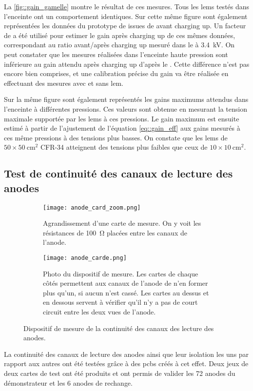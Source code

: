       La \autoref{fig::gain_gamelle} montre le résultat de ces mesures. Tous les \glspl{lem} testés dans l'enceinte ont un comportement identiques. Sur cette même figure sont également représentées les données du prototype de \threeL{} issues de \cite{Cantini2014} avant charging up. Un facteur de  a été utilisé pour estimer le gain après charging up de ces mêmes données, correspondant au ratio avant/après charging up mesuré dans le \threeL{} à \SI{3.4}{\kilo\volt}. On peut constater que les mesures réalisées dans l'enceinte haute pression sont inférieure au gain attendu après charging up d'après le \threeL{}. Cette différence n'est pas encore bien comprises, et une calibration précise du gain va être réalisée en effectuant des mesures avec et sans \gls{lem}. 

      Sur la même figure sont également représentés les gains maximums attendus dans l'enceinte à différentes pressions. Ces valeurs sont obtenue en mesurant la tension maximale supportée par les \glspl{lem} à ces pressions. Le gain maximum est ensuite estimé à partir de l'ajustement de l'équation \eqref{eq::gain_eff} aux gains mesurés à ces même pressions à des tensions plus basses. On constate que les \glspl{lem} de $50\times\SI{50}{\centi\meter\squared}$  CFR-34 atteignent des tensions plus faibles que ceux de $10\times\SI{10}{\centi\meter\squared}$.
        
    \subsection{Test de continuité des canaux de lecture des anodes}\label{sec::test_anode}

      \begin{figure}
        \begin{subfigure}[t]{0.48\textwidth}
          \texttt{[image: anode\_card\_zoom.png]}
          \caption{\label{fig::anode_card_zoom}Agrandissement d'une carte de mesure. On y voit les résistances de \SI{100}{\ohm} placées entre les canaux de l'anode.}
        \end{subfigure}
        \hfill
        \begin{subfigure}[t]{0.48\textwidth}
          \texttt{[image: anode\_carde.png]}
          \caption{\label{fig::anode_card}Photo du dispositif de mesure. Les cartes de chaque côtés permettent aux  canaux de l'anode de n'en former plus qu'un, si aucun n'est cassé. Les cartes au dessus et en dessous servent à vérifier qu'il n'y a pas de court circuit entre les deux vues de l'anode.}
        \end{subfigure}
        \caption[Dispositif de mesure de la continuité des canaux de lecture des anodes]{\label{fig::test_anode}Dispositif de mesure de la continuité des canaux des lecture des anodes.}
      \end{figure}
      La continuité des canaux de lecture des anodes ainsi que leur isolation les uns par rapport aux autres ont été testées grâce à des \glspl{pcb} créés à cet effet. Deux jeux de deux cartes de test ont été produits et ont permis de valider les 72 anodes du démonstrateur \SSS{} et les 6 anodes de rechange.
      

